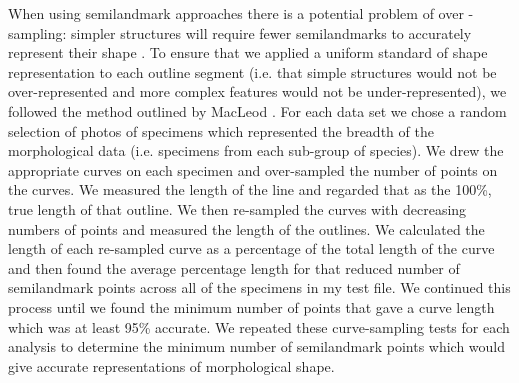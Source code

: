 \documentclass[12pt,a4paper]{article}
\begin{document}
	When using semilandmark approaches there is a potential problem of over - sampling: simpler structures will require fewer semilandmarks to accurately represent their shape  \citep{MacLeod2012}. To ensure that we applied a uniform standard of shape representation to each outline segment (i.e. that simple structures would not be over-represented and more complex features would not be under-represented), we followed the method outlined by MacLeod \citeyearpar{MacLeod2012}. For each data set we chose a random selection of photos of specimens which represented the breadth of the morphological data (i.e. specimens from each sub-group of species). We drew the appropriate curves on each specimen and over-sampled the number of points on the curves. We measured the length of the line and regarded that as the 100\%, true length of that outline. We then re-sampled the curves with decreasing numbers of points and measured the length of the outlines. We calculated the length of each re-sampled curve as a percentage of the total length of the curve and then found the average percentage length for that reduced number of semilandmark points across all of the specimens in my test file. We continued this process until we found the minimum number of points that gave a curve length which was at least 95\% accurate.  We repeated these curve-sampling tests for each analysis to determine the minimum number of semilandmark points which would give accurate representations of morphological shape.
	
\end{document}
